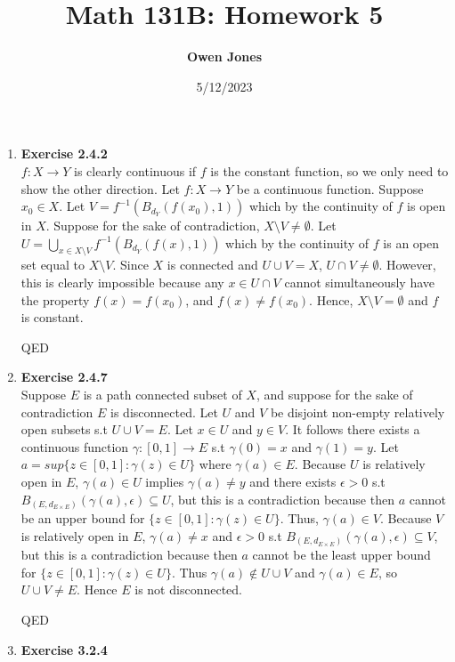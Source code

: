 \documentclass[10pt]{article}
\title{\bf Math 131B: Homework 5}
\date{5/12/2023}
\author{\bf Owen Jones}
\begin{document}
\maketitle

\begin{enumerate}[label=Problem \arabic*.]
    \item \textbf{Exercise 2.4.2}\\
    $f:X\rightarrow Y$ is clearly continuous if $f$ is the constant function, so we only need to show the other direction.
    Let $f:X\rightarrow Y$ be a continuous function. 
    Suppose $x_0\in X$. 
    Let $V=f^{-1}(B_{d_Y}(f(x_0),1))$ which by the continuity of $f$ is open in $X$.
    Suppose for the sake of contradiction, $X\setminus V\neq\emptyset$.
    Let $U=\displaystyle{\bigcup_{x\in X\setminus V}}f^{-1}(B_{d_Y}(f(x),1))$ which by the continuity of $f$ is an open set equal to $X\setminus V$.
    Since $X$ is connected and $U\cup V=X$, $U\cap V\neq\emptyset$. 
    However, this is clearly impossible because any $x\in U\cap V$ cannot simultaneously have the property $f(x)=f(x_0)$, and $f(x)\neq f(x_0)$. 
    Hence, $X\setminus V=\emptyset$ and $f$ is constant.\par 
    QED
    \item \textbf{Exercise 2.4.7}\\
    Suppose $E$ is a path connected subset of $X$, and suppose for the sake of contradiction $E$ is disconnected.
    Let $U$ and $V$ be disjoint non-empty relatively open subsets s.t $U\cup V=E$.
    Let $x\in U$ and $y\in V$.
    It follows there exists a continuous function $\gamma:[0,1]\rightarrow E$ s.t $\gamma(0)=x$ and $\gamma(1)=y$.
    Let $a=sup\{z\in[0,1]:\gamma(z)\in U\}$ where $\gamma(a)\in E$.
    Because $U$ is relatively open in $E$, $\gamma(a)\in U$ implies $\gamma(a)\neq y$ and there exists $\epsilon>0$ s.t $B_{(E,d_{E\times E})}(\gamma(a),\epsilon)\subseteq U$, but this is a contradiction because then $a$ cannot be an upper bound for $\{z\in[0,1]:\gamma(z)\in U\}$.
    Thus, $\gamma(a)\in V$. Because $V$ is relatively open in $E$, $\gamma(a)\neq x$ and $\epsilon>0$ s.t $B_{(E,d_{E\times E})}(\gamma(a),\epsilon)\subseteq V$, but this is a contradiction because then $a$ cannot be the least upper bound for $\{z\in[0,1]:\gamma(z)\in U\}$.
    Thus $\gamma(a)\notin U\cup V$ and $\gamma(a)\in E$, so $U\cup V\neq E$. Hence $E$ is not disconnected.\par  
    QED
    \item \textbf{Exercise 3.2.4}\\

\end{enumerate}
\end{document}
